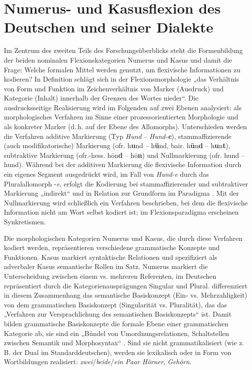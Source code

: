 \chapter{Numerus- und Kasusflexion des Deutschen und seiner Dialekte}
\label{chap:4}
Im Zentrum des zweiten Teils des Forschungsüberblicks steht die Formenbildung der beiden nominalen Flexionskategorien Numerus und Kasus und damit die Frage: Welche formalen Mittel werden genutzt, um flexivische Informationen zu kodieren? In  Definition schlägt sich in der Flexionsmorphologie „das Verhältnis von Form und Funktion im Zeichenverhältnis von Marker (Ausdruck) und Kategorie (Inhalt) innerhalb der Grenzen des Wortes nieder“. Die ausdrucksseitige Realisierung wird im Folgenden auf zwei Ebenen analysiert: als morphologisches Verfahren im Sinne einer prozessorientierten Morphologie und als konkreter Marker (d.\,h. auf der Ebene des Allomorphs). Unterschieden werden die Verfahren additive Markierung (Typ \textit{Hund} -- \textit{Hund-}\textbf{\textit{e}}), stammaffizierende (auch modifikatorische) Markierung (ofr. h\textbf{u}nd -- h\textbf{ü}nd, bair. h\textbf{ū}n\textbf{d} -- h\textbf{u}n\textbf{t}), subtraktive Markierung (ofr.-hess. hōn\textbf{d} -- hö\textbf{n}) und Nullmarkierung (ofr. hund -- hund). Während bei der additiven Markierung die flexivische Information durch ein eigenes Segment ausgedrückt wird, im Fall von \textit{Hund-e} durch das Pluralallomorph -\textit{e}, erfolgt die Kodierung bei stammaffizierender und subtraktiver Markierung „indirekt“ und in Relation zur Grundform im Paradigma \citep[11]{Wurzel2000}. Mit der Nullmarkierung wird schließlich ein Verfahren beschrieben, bei dem die flexivische Information nicht am Wort selbst kodiert ist; im Flexionsparadigma erscheinen Synkretismen.

Die morphologischen Kategorien Numerus und Kasus, die durch diese Verfahren kodiert werden, repräsentieren verschiedene grammatische Konzepte und Funktionen. Kasus markiert syntaktische Relationen und spezifiziert als adverbaler Kasus semantische Rollen im Satz. Numerus markiert die Unterscheidung zwischen einem vs. mehreren Referenten, im Deutschen repräsentiert durch die Kategorienausprägungen Singular und Plural. \citet[62--66]{Wurzel1984} differenziert in diesem Zusammenhang das semantische Basiskonzept (Ein- vs. Mehrzahligkeit) von dem grammatischen Basiskonzept (Singularität vs. Pluralität), das das „Verfahren zur Versprachlichung des semantischen Basiskonzepts“ ist. Damit bilden grammatische Basiskonzepte die formale Ebene einer grammatischen Kategorie ab, sie sind ein „Bündel von Umordnungsrelationen, Schaltstellen zwischen Semantik und Morphosyntax“ \citep[62]{Wurzel1984}. Sind sie nicht grammatikalisiert (wie z.\,B. der Dual im Standarddeutschen), werden sie lexikalisch oder in Form von Wortbildungen realisiert: \textit{zwei}/\textit{beide}/\textit{ein Paar Hörner}, \textit{Gehörn}.

